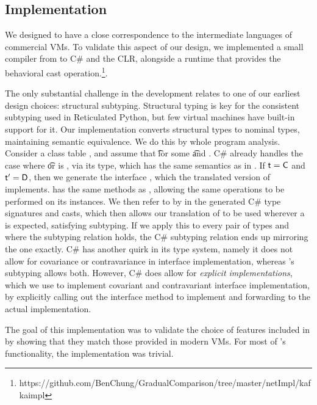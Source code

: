 \documentclass[runnningheads]{tex/llncs}
\begin{document}
\subsection{Implementation}

We designed \kafka to have a close correspondence to the intermediate
languages of commercial VMs. To validate this aspect of our design, we
implemented a small compiler from \kafka to C\# and the CLR, alongside a
runtime that provides the behavioral cast
operation.\footnote{https://github.com/BenChung/GradualComparison/tree/master/netImpl/kafkaimpl}.

The only substantial challenge in the development relates to one of our
earliest design choices: structural subtyping.  Structural typing is key for
the consistent subtyping used in Reticulated Python, but few virtual
machines have built-in support for it. Our implementation converts
structural types to nominal types, maintaining semantic equivalence.  We do
this by whole program analysis. Consider a class table \K, and assume that
\StrSub{}\K\t\tp for some \t and \tp. C\# already handles the case where \t
or \tp is \any, via its  type, which has the same semantics as
\any in \kafka. If $\t=\C$ and $\tp=\D$, then we generate the interface
, which the translated version of \C implements.  has the same
methods as \D, allowing the same operations to be performed on its
instances. We then refer to \D by  in the generated C\# type
signatures and casts, which then allows our translation of \C to be used
wherever a \D is expected, satisfying subtyping. If we apply this to every
pair of types \C and \D where the subtyping relation holds, the C\#
subtyping relation ends up mirroring the \kafka one exactly.  C\# has
another quirk in its type system, namely it does not allow for covariance or
contravariance in interface implementation, whereas \kafka's subtyping
allows both. However, C\# does allow for \emph{explicit implementations},
which we use to implement covariant and contravariant interface
implementation, by explicitly calling out the interface method to implement
and forwarding to the actual implementation.

The goal of this implementation was to validate the choice of features
included in \kafka by showing that they match those provided in modern VMs.
For most of \kafka's functionality, the implementation was trivial. 

\end{document}
